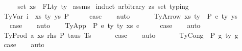 \begin{isabellebody}
\ \ \ \ \ set\ xs\ {\isacharequal}{\kern0pt}\ FLty\ ty{}{\isacharparenright}{\kern0pt}{\isachardoublequoteclose}\isanewline
%
\isadelimproof
%
\endisadelimproof
%
\isatagproof
{}\isamarkupfalse%
\ assms\isanewline
{}\isamarkupfalse%
\ {\isacharparenleft}{\kern0pt}induct\ arbitrary{\isacharcolon}{\kern0pt}\ zs\ set{\isacharcolon}{\kern0pt}\ typing{\isacharparenright}{\kern0pt}\isanewline
\ \ \isamarkupfalse%
\ {\isacharparenleft}{\kern0pt}TyVar\ i\ {\isasymGamma}\ xs\ ty\ ys\ P{\isacharparenright}{\kern0pt}\isanewline
\ \ \isamarkupfalse%
\ \isamarkupfalse%
\ {\isacharquery}{\kern0pt}case\isanewline
\ \ \isamarkupfalse%
\ auto\isanewline
\ \ \isamarkupfalse%
\isanewline
{}\isamarkupfalse%
\isanewline
\ \ \isamarkupfalse%
\ {\isacharparenleft}{\kern0pt}TyArrow\ xs\ ty{}\ {\isasymGamma}\ P\ e\ ty{}\ ys{\isacharparenright}{\kern0pt}\isanewline
\ \ \isamarkupfalse%
\ \isamarkupfalse%
\ {\isacharquery}{\kern0pt}case\isanewline
\ \ \isamarkupfalse%
\ auto\isanewline
{}\isamarkupfalse%
\isanewline
\ \ \isamarkupfalse%
\ {\isacharparenleft}{\kern0pt}TyApp\ {\isasymGamma}\ P\ e{}\ ty{}\ ty{}\ xs\ e{}{\isacharparenright}{\kern0pt}\isanewline
\ \ \isamarkupfalse%
\ \isamarkupfalse%
\ {\isacharquery}{\kern0pt}case\isanewline
\ \ \isamarkupfalse%
\ auto\isanewline
\ \ \isamarkupfalse%
\isanewline
{}\isamarkupfalse%
\isanewline
\ \ \isamarkupfalse%
\ {\isacharparenleft}{\kern0pt}TyProd\ a\ xs\ rhs\ P\ taus\ Ts\ {\isasymGamma}{\isacharparenright}{\kern0pt}\isanewline
\ \ \isamarkupfalse%
\ \isamarkupfalse%
\ {\isacharquery}{\kern0pt}case\isanewline
\ \ \isamarkupfalse%
\ auto\isanewline
\ \ \isamarkupfalse%
\isanewline
{}\isamarkupfalse%
\isanewline
\ \ \isamarkupfalse%
\ {\isacharparenleft}{\kern0pt}TyCong\ {\isasymGamma}\ P\ g{}\ ty\ g{}{\isacharparenright}{\kern0pt}\isanewline
\ \ \isamarkupfalse%
\ {\isacharquery}{\kern0pt}case\isanewline
\ \ \isamarkupfalse%
\ auto\isanewline
\ \ \isamarkupfalse%

\end{isabellebody}
